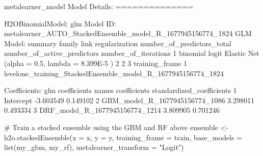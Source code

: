 \documentclass[
  letterpaper,
  DIV=11,
  numbers=noendperiod]{scrartcl}
\newenvironment{Shaded}{\begin{snugshade}}{\end{snugshade}}
\newcommand{\AttributeTok}[1]{\textcolor[rgb]{0.40,0.45,0.13}{#1}}
\newcommand{\CommentTok}[1]{\textcolor[rgb]{0.37,0.37,0.37}{#1}}
\newcommand{\DecValTok}[1]{\textcolor[rgb]{0.68,0.00,0.00}{#1}}
\newcommand{\ErrorTok}[1]{\textcolor[rgb]{0.68,0.00,0.00}{#1}}
\newcommand{\FloatTok}[1]{\textcolor[rgb]{0.68,0.00,0.00}{#1}}
\newcommand{\FunctionTok}[1]{\textcolor[rgb]{0.28,0.35,0.67}{#1}}
\newcommand{\NormalTok}[1]{\textcolor[rgb]{0.00,0.23,0.31}{#1}}
\newcommand{\OtherTok}[1]{\textcolor[rgb]{0.00,0.23,0.31}{#1}}
\newcommand{\SpecialCharTok}[1]{\textcolor[rgb]{0.37,0.37,0.37}{#1}}
\newcommand{\StringTok}[1]{\textcolor[rgb]{0.13,0.47,0.30}{#1}}
\begin{document}
\begin{Shaded}
\begin{Highlighting}[]
\NormalTok{metalearner\_model}
\NormalTok{Model Details}\SpecialCharTok{:}
\ErrorTok{==============}

\NormalTok{H2OBinomialModel}\SpecialCharTok{:}\NormalTok{ glm}
\NormalTok{Model ID}\SpecialCharTok{:}\NormalTok{  metalearner\_AUTO\_StackedEnsemble\_model\_R\_1677945156774\_1824 }
\NormalTok{GLM Model}\SpecialCharTok{:}\NormalTok{ summary}
\NormalTok{    family  link                                regularization number\_of\_predictors\_total number\_of\_active\_predictors number\_of\_iterations}
\DecValTok{1}\NormalTok{ binomial logit Elastic }\FunctionTok{Net}\NormalTok{ (}\AttributeTok{alpha =} \FloatTok{0.5}\NormalTok{, }\AttributeTok{lambda =} \FloatTok{8.399E{-}5}\NormalTok{ )                          }\DecValTok{2}                           \DecValTok{2}                    \DecValTok{3}
\NormalTok{                                                training\_frame}
\DecValTok{1}\NormalTok{ levelone\_training\_StackedEnsemble\_model\_R\_1677945156774\_1824}

\NormalTok{Coefficients}\SpecialCharTok{:}\NormalTok{ glm coefficients}
\NormalTok{                           names coefficients standardized\_coefficients}
\DecValTok{1}\NormalTok{                      Intercept    }\SpecialCharTok{{-}}\FloatTok{3.603549}                  \FloatTok{0.149102}
\DecValTok{2}\NormalTok{ GBM\_model\_R\_1677945156774\_1086     }\FloatTok{3.298011}                  \FloatTok{0.493334}
\DecValTok{3}\NormalTok{ DRF\_model\_R\_1677945156774\_1214     }\FloatTok{3.809905}                  \FloatTok{0.701246}
\end{Highlighting}
\end{Shaded}

\begin{Shaded}
\begin{Highlighting}[]
\CommentTok{\# Train a stacked ensemble using the GBM and RF above}
\NormalTok{ensemble }\OtherTok{\textless{}{-}} \FunctionTok{h2o.stackedEnsemble}\NormalTok{(}\AttributeTok{x =}\NormalTok{ x,}
                                \AttributeTok{y =}\NormalTok{ y,}
                                \AttributeTok{training\_frame =}\NormalTok{ train,}
                                \AttributeTok{base\_models =} \FunctionTok{list}\NormalTok{(my\_gbm, my\_rf),}
                                \AttributeTok{metalearner\_transform =} \StringTok{"Logit"}\NormalTok{)}
\end{Highlighting}
\end{Shaded}
\end{document}

